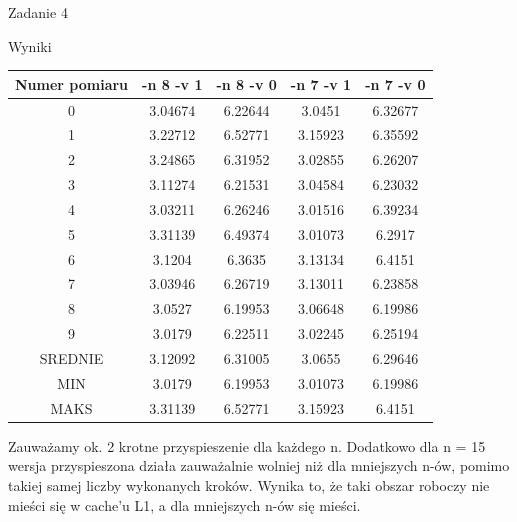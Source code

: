 \documentclass[11pt,wide]{mwart}
\begin{document}
\begin{section}{Zadanie 4}
\begin{subsection}{Wyniki}
\begin{center}
\begin{tabular}{|c|c|c|c|c|}
\hline
Numer pomiaru &  -n 8 -v 1 & -n 8 -v 0 & -n 7 -v 1 & -n 7 -v 0 \\
\hline
0 & 3.04674 & 6.22644 & 3.0451 & 6.32677\\
\hline
1 & 3.22712 & 6.52771 & 3.15923 & 6.35592\\
\hline
2 & 3.24865 & 6.31952 & 3.02855 & 6.26207\\
\hline
3 & 3.11274 & 6.21531 & 3.04584 & 6.23032\\
\hline
4 & 3.03211 & 6.26246 & 3.01516 & 6.39234\\
\hline
5 & 3.31139 & 6.49374 & 3.01073 & 6.2917\\
\hline
6 & 3.1204 & 6.3635 & 3.13134 & 6.4151\\
\hline
7 & 3.03946 & 6.26719 & 3.13011 & 6.23858\\
\hline
8 & 3.0527 & 6.19953 & 3.06648 & 6.19986\\
\hline
9 & 3.0179 & 6.22511 & 3.02245 & 6.25194\\
\hline
SREDNIE & 3.12092 & 6.31005 & 3.0655 & 6.29646\\
\hline
MIN & 3.0179 & 6.19953 & 3.01073 & 6.19986\\
\hline
MAKS & 3.31139 & 6.52771 & 3.15923 & 6.4151\\
\hline
\end{tabular}
\end{center}
Zauważamy ok. 2 krotne przyspieszenie dla każdego n. Dodatkowo dla n = 15 wersja przyspieszona działa zauważalnie wolniej niż dla mniejszych n-ów, pomimo takiej samej liczby wykonanych kroków. Wynika to, że taki obszar roboczy nie mieści się w cache'u L1, a dla mniejszych n-ów się mieści.
\end{subsection}

\end{section}
\end{document}
